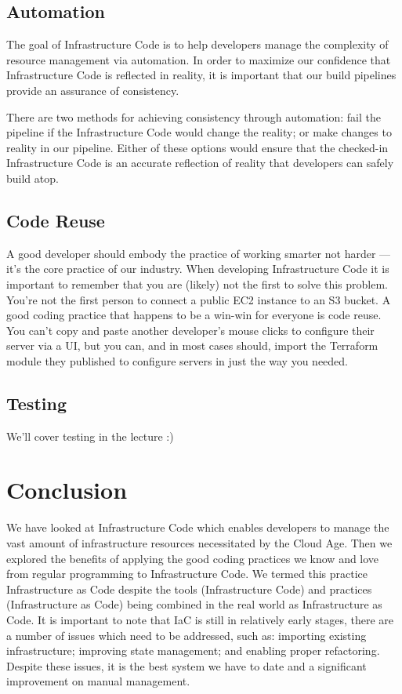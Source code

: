 \subsection{Automation}
The goal of Infrastructure Code is to help developers manage the complexity of resource management via automation.
In order to maximize our confidence that Infrastructure Code is reflected in reality,
it is important that our build pipelines provide an assurance of consistency.

There are two methods for achieving consistency through automation: fail the pipeline if the Infrastructure Code would change the reality; or make changes to reality in our pipeline.
Either of these options would ensure that the checked-in Infrastructure Code is an accurate reflection of reality that developers can safely build atop.

\subsection{Code Reuse}
A good developer should embody the practice of working smarter not harder ---
it's the core practice of our industry.
When developing Infrastructure Code it is important to remember that you are (likely) not the first to solve this problem.
You're not the first person to connect a public EC2 instance to an S3 bucket.
A good coding practice that happens to be a win-win for everyone is code reuse.
You can't copy and paste another developer's mouse clicks to configure their server via a UI,
but you can, and in most cases should,
import the Terraform module they published to configure servers in just the way you needed.

\subsection{Testing}
We'll cover testing in the lecture :)

\section{Conclusion}
We have looked at Infrastructure Code which enables developers to manage the vast amount of infrastructure resources necessitated by the Cloud Age.
Then we explored the benefits of applying the good coding practices we know and love from regular programming to Infrastructure Code.
We termed this practice Infrastructure as Code despite the tools (Infrastructure Code) and practices (Infrastructure as Code) being combined in the real world as Infrastructure as Code.
It is important to note that IaC is still in relatively early stages,
there are a number of issues which need to be addressed, such as: importing existing infrastructure; improving state management; and enabling proper refactoring.
Despite these issues,
it is the best system we have to date and a significant improvement on manual management.

